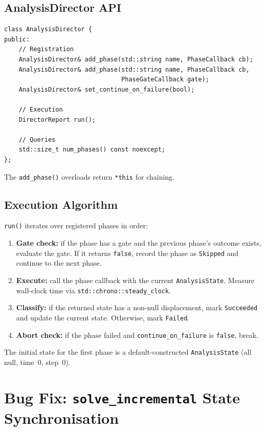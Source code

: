 \subsection{AnalysisDirector API}

\begin{verbatim}
class AnalysisDirector {
public:
    // Registration
    AnalysisDirector& add_phase(std::string name, PhaseCallback cb);
    AnalysisDirector& add_phase(std::string name, PhaseCallback cb,
                                PhaseGateCallback gate);
    AnalysisDirector& set_continue_on_failure(bool);

    // Execution
    DirectorReport run();

    // Queries
    std::size_t num_phases() const noexcept;
};
\end{verbatim}

The \texttt{add\_phase()} overloads return \texttt{*this} for chaining.

\subsection{Execution Algorithm}

\texttt{run()} iterates over registered phases in order:

\begin{enumerate}
  \item \textbf{Gate check:} if the phase has a gate and the previous
        phase's outcome exists, evaluate the gate.  If it returns
        \texttt{false}, record the phase as \texttt{Skipped} and
        continue to the next phase.
  \item \textbf{Execute:} call the phase callback with the current
        \texttt{AnalysisState}.  Measure wall-clock time via
        \texttt{std::chrono::steady\_clock}.
  \item \textbf{Classify:} if the returned state has a non-null
        displacement, mark \texttt{Succeeded} and update the current
        state.  Otherwise, mark \texttt{Failed}.
  \item \textbf{Abort check:} if the phase failed and
        \texttt{continue\_on\_failure} is \texttt{false}, break.
\end{enumerate}

The initial state for the first phase is a default-constructed
\texttt{AnalysisState} (all null, time~0, step~0).


\section{Bug Fix: \texttt{solve\_incremental} State Synchronisation}
\label{sec:solve_incremental_sync}

